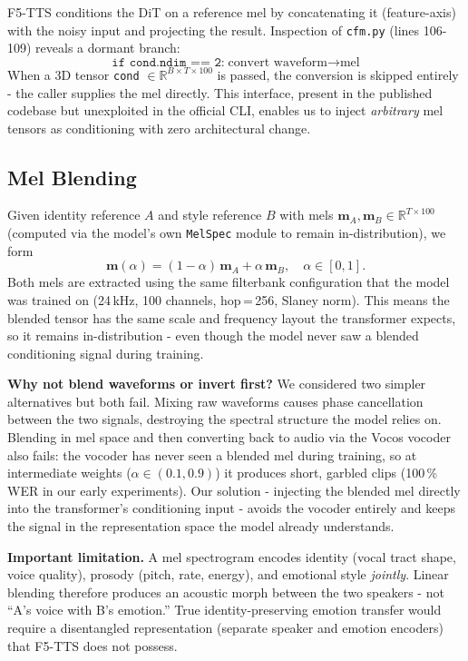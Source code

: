 \documentclass[11pt,a4paper,twocolumn]{article}
\begin{document}
F5-TTS conditions the DiT on a reference mel by concatenating it
(feature-axis) with the noisy input and projecting the result.  Inspection of \texttt{cfm.py} (lines 106-109) reveals
a dormant branch:
\begin{equation*}
\texttt{if cond.ndim == 2:}\;\text{convert waveform}\rightarrow\text{mel}
\end{equation*}
When a 3D tensor \texttt{cond} $\in\mathbb{R}^{B\times T\times 100}$ is
passed, the conversion is skipped entirely - the caller supplies the mel
directly.  This interface, present in the published codebase but unexploited
in the official CLI, enables us to inject \emph{arbitrary} mel tensors as
conditioning with zero architectural change.

\subsection{Mel Blending}

Given identity reference $A$ and style reference $B$ with mels
$\mathbf{m}_A, \mathbf{m}_B \in\mathbb{R}^{T\times 100}$ (computed via
the model's own \texttt{MelSpec} module to remain in-distribution), we form
\begin{equation}
  \mathbf{m}{(\alpha)} = (1-\alpha)\,\mathbf{m}_A + \alpha\,\mathbf{m}_B,
  \quad \alpha\in[0,1].
  \label{eq:blend}
\end{equation}
Both mels are extracted using the same filterbank configuration
that the model was trained on (24\,kHz, 100 channels, hop\,=\,256,
Slaney norm).  This means the blended tensor has the same scale and
frequency layout the transformer expects, so it remains
in-distribution - even though the model never saw a blended
conditioning signal during training.

\textbf{Why not blend waveforms or invert first?}
We considered two simpler alternatives but both fail.
Mixing raw waveforms causes phase cancellation between the two signals,
destroying the spectral structure the model relies on.
Blending in mel space and then converting back to audio via the Vocos
vocoder also fails: the vocoder has never seen a blended mel during
training, so at intermediate weights ($\alpha\in(0.1,0.9)$) it produces
short, garbled clips (100\,\% WER in our early experiments).
Our solution - injecting the blended mel directly into the transformer's
conditioning input - avoids the vocoder entirely and keeps the signal
in the representation space the model already understands.

\textbf{Important limitation.}
A mel spectrogram encodes identity (vocal tract shape, voice quality),
prosody (pitch, rate, energy), and emotional style \emph{jointly}.
Linear blending therefore produces an acoustic morph between the two
speakers - not ``A's voice with B's emotion.''  True identity-preserving
emotion transfer would require a disentangled representation (separate
speaker and emotion encoders) that F5-TTS does not possess.
\end{document}
